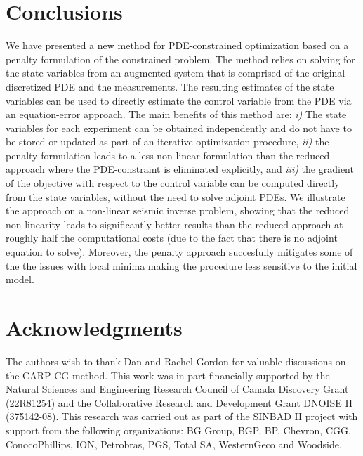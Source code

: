 \documentclass{iopart}
\begin{document}
\section{Conclusions}
\label{conclusion}
We have presented a new method for PDE-constrained optimization based on
a penalty formulation of the constrained problem. The method
relies on solving for the state variables from an augmented system that
is comprised of the original discretized PDE and the measurements. The
resulting estimates of the state variables can be used to directly
estimate the control variable from the PDE via an equation-error
approach. The main benefits of this method are: \emph{i)} The state
variables for each experiment can be obtained independently and do not
have to be stored or updated as part of an iterative optimization
procedure, \emph{ii)} the penalty formulation leads to a less non-linear
formulation than the reduced approach where the PDE-constraint is
eliminated explicitly, and \emph{iii)} the gradient of the objective
with respect to the control variable can be computed directly from the
state variables, without the need to solve adjoint PDEs. We illustrate
the approach on a non-linear seismic inverse problem, showing that the
reduced non-linearity leads to significantly better results than the
reduced approach at roughly half the computational costs (due to the
fact that there is no adjoint equation to solve). Moreover, the penalty
approach succesfully mitigates some of the the issues with local minima
making the procedure less sensitive to the initial model.

\section*{Acknowledgments}
The authors wish to thank Dan and Rachel Gordon for valuable discussions
on the CARP-CG method. This work was in part financially supported by
the Natural Sciences and Engineering Research Council of Canada
Discovery Grant (22R81254) and the Collaborative Research and
Development Grant DNOISE II (375142-08). This research was carried out
as part of the SINBAD II project with support from the following
organizations: BG Group, BGP, BP, Chevron, CGG, ConocoPhillips, ION,
Petrobras, PGS, Total SA, WesternGeco and Woodside.


\clearpage
\end{document}
